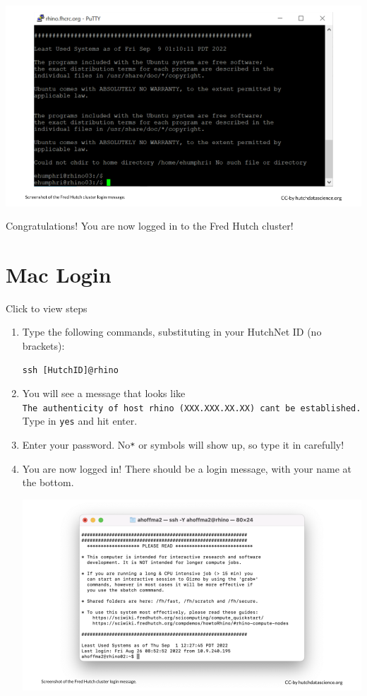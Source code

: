 \documentclass[
]{book}
\begin{document}
\begin{enumerate}
  \includegraphics[width=1\linewidth]{resources/images/04-logging-in_files/figure-latex//1BQxrVYdKZTbpCaF-i_q9w7s9x034lEXpQZDU-Sl09cs_g15643d101eb_4_60}
\end{enumerate}

Congratulations! You are now logged in to the Fred Hutch cluster!

\hypertarget{mac-login}{%
\section{Mac Login}\label{mac-login}}

Click to view steps

\begin{enumerate}
\def\labelenumi{\arabic{enumi}.}
\item
  Type the following commands, substituting in your HutchNet ID (no brackets):

\begin{verbatim}
ssh [HutchID]@rhino
\end{verbatim}
\item
  You will see a message that looks like \texttt{The\ authenticity\ of\ host\ \textquotesingle{}rhino\ (XXX.XXX.XX.XX)\textquotesingle{}\ can\textquotesingle{}t\ be\ established.} Type in \texttt{yes} and hit enter.
\item
  Enter your password. No\texttt{*} or symbols will show up, so type it in carefully!
\item
  You are now logged in! There should be a login message, with your name at the bottom.

  \includegraphics[width=1\linewidth]{resources/images/04-logging-in_files/figure-latex//1BQxrVYdKZTbpCaF-i_q9w7s9x034lEXpQZDU-Sl09cs_g149d37dd4a1_0_43}
\end{enumerate}
\end{document}
